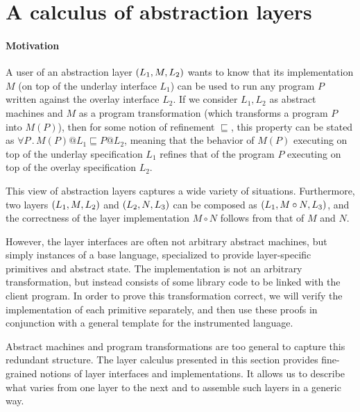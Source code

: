 \section{A calculus of abstraction layers}
\label{sec:layer}

\paragraph{Motivation}

A user of an abstraction layer $(L_1,M,L_2)$ wants to know
that its implementation $M$ (on top of the underlay interface $L_1$)
can be used to run any program $P$ written against the overlay
interface $L_2$.
If we consider $L_1, L_2$ as abstract machines
and $M$ as a program transformation (which transforms
a program $P$ into $M(P)$), 
then for some notion of refinement $\sqsubseteq$,
this property can be stated as
$\forall P \,.\, M(P) @ L_1 \sqsubseteq P @ L_2$,
meaning that the behavior of $M(P)$ executing
on top of the underlay specification $L_1$
refines that of the program $P$
executing on top of the overlay specification $L_2$.

This view of abstraction layers captures a wide variety of situations.
Furthermore, two layers $(L_1,M,L_2)$ and
$(L_2,N,L_3)$ can be composed as $(L_1,M \circ
  N,L_3)$, and the correctness of the layer implementation $M \circ
N$ follows from that of $M$ and $N$.  

However, 
the layer interfaces
are often not arbitrary abstract machines, but simply instances of a base
language, specialized to provide layer-specific primitives and
abstract state.  The implementation is not an arbitrary
transformation, but instead consists of some library code to be linked
with the client program.  In order to prove this transformation correct,
we will verify the implementation of each primitive
separately, and then use these proofs in conjunction with a
general template for the instrumented language.

Abstract machines and program transformations are too general to
capture this redundant structure.  The layer calculus
presented in this section provides fine-grained notions of layer
interfaces and implementations.  It allows us to describe what varies
from one layer to the next and to assemble such layers 
in a generic way.

